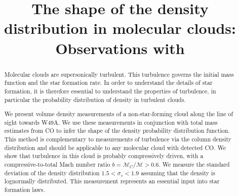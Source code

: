 \title{The shape of the density distribution in molecular clouds: Observations with
\formaldehyde}
\begin{abstract}
    Molecular clouds are supersonically turbulent.  This turbulence governs
    the initial mass function and the star formation rate.  In order to
    understand the details of star formation, it is therefore essential to understand
    the properties of turbulence, in particular the probability distribution of
    density in turbulent clouds.

    We present \formaldehyde volume density measurements of a non-star-forming
    cloud along the line of sight towards W49A. We use these measurements in
    conjunction with total mass estimates from CO to infer the shape of the
    density probability distribution function.  This method is complementary to
    measurements of turbulence via the column density distribution and should
    be applicable to any molecular cloud with detected CO.  We show that
    turbulence in this cloud is probably compressively driven, with a
    compressive-to-total Mach number ratio $b = \mathcal{M}_C/\mathcal{M}>0.6$.  
    We measure the standard deviation of the density distribution $1.5 < \sigma_s < 1.9$
    assuming that the density is lognormally distributed.  This measurement
    represents an essential input into star formation laws.



\end{abstract}
